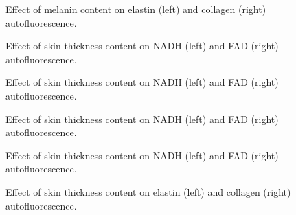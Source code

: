 \begin{appendices}
\begin{figure}[!htbp]
    \centering
    \caption{Effect of melanin content on elastin (left) and collagen (right) autofluorescence.}%
    \label{fig:450nadhcollagen-melanin}%
\end{figure}


\begin{figure}[!htbp]
    \centering
    \caption{Effect of skin thickness content on NADH (left) and FAD (right) autofluorescence.}%
    \label{fig:260nadhfad-thickness}%
\end{figure}

\begin{figure}[!htbp]
    \centering
    \caption{Effect of skin thickness content on NADH (left) and FAD (right) autofluorescence.}%
    \label{fig:320nadhfad-thickness}%
\end{figure}

\begin{figure}[!htbp]
    \centering
    \caption{Effect of skin thickness content on NADH (left) and FAD (right) autofluorescence.}%
    \label{fig:365nadhfad-thickness}%
\end{figure}

\begin{figure}[!htbp]
    \centering
    \caption{Effect of skin thickness content on NADH (left) and FAD (right) autofluorescence.}%
    \label{fig:450nadhfad-thickness}%
\end{figure}


\begin{figure}[!htbp]
    \centering
    \caption{Effect of skin thickness content on elastin (left) and collagen (right) autofluorescence.}%
    \label{fig:260elastincollagen-thickness}%
\end{figure}


\end{appendices}
